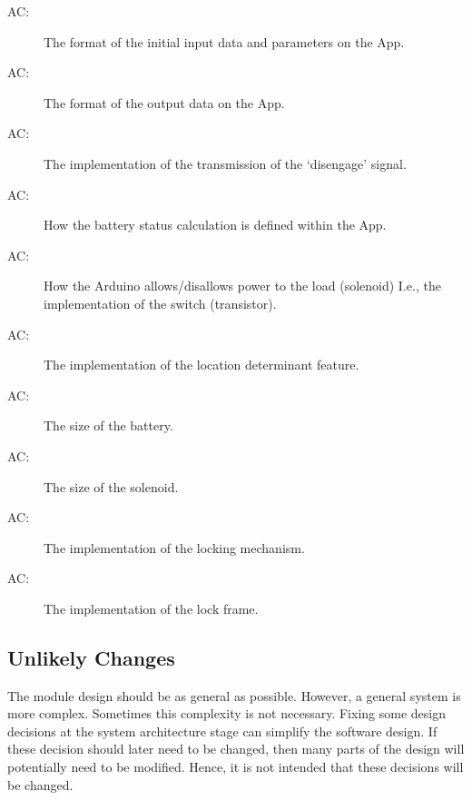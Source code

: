 \documentclass[12pt, titlepage]{article}
\newcounter{acnum}
\newcommand{\actheacnum}{AC\theacnum}
\begin{document}
\begin{description}
\item[\actheacnum\label{acInput}:] The format of the initial input data and parameters on the App. 
\item[\actheacnum\label{acOutput}:] The format of the output data on the App. 
\item[\actheacnum\label{acWireless}:] The implementation of the transmission of the ‘disengage’ signal. 
\item[\actheacnum\label{acBatteryStatus}:] How the battery status calculation is defined within the App. 
\item[\actheacnum\label{acPowerSignal}:] How the Arduino allows/disallows power to the load (solenoid) I.e., the implementation of the switch (transistor). 
\item[\actheacnum\label{acGeocaching}:] The implementation of the location determinant feature. 
\item[\actheacnum\label{acBattery}:] The size of the battery. 
\item[\actheacnum\label{acMagnet}:] The size of the solenoid. 
\item[\actheacnum\label{acLockingMechanism}:] The implementation of the locking mechanism. 
\item[\actheacnum\label{acLockFrame}:] The implementation of the lock frame. 

\end{description}

\subsection{Unlikely Changes} \label{SecUchange}

The module design should be as general as possible. However, a general system is
more complex. Sometimes this complexity is not necessary. Fixing some design
decisions at the system architecture stage can simplify the software design. If
these decision should later need to be changed, then many parts of the design
will potentially need to be modified. Hence, it is not intended that these
decisions will be changed.
\end{document}
